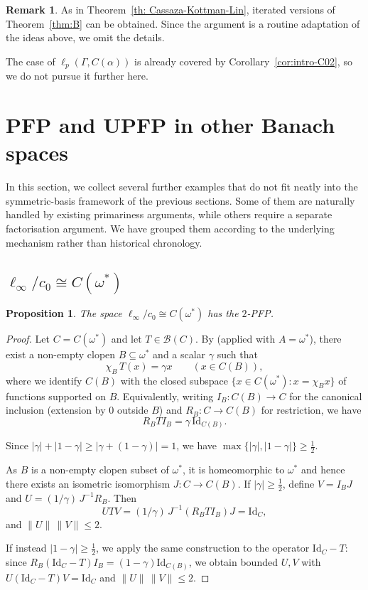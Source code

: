\documentclass[11pt]{amsart}
\theoremstyle{plain}
\newtheorem{proposition}[theorem]{Proposition}
\theoremstyle{definition}
\newtheorem{remark}[theorem]{Remark}
\numberwithin{equation}{section}
\newcommand{\Id}{\mathrm{Id}}
\renewcommand{\le}{\leqslant}
\renewcommand{\ge}{\geqslant}
\begin{document}
\begin{remark}
As in Theorem~\ref{th: Cassaza-Kottman-Lin}, iterated versions of Theorem~\ref{thm:B} can be obtained.  Since the argument is a routine adaptation of the ideas above, we omit the details.
\end{remark}

The case of $\ell_p(\Gamma,C(\alpha))$ is already covered by Corollary~\ref{cor:intro-C02}, so we do not pursue it further here.

\section{PFP and UPFP in other Banach spaces}

In this section, we collect several further examples that do not fit neatly into the symmetric-basis framework of the previous sections. Some of them are naturally handled by existing primariness arguments, while others require a separate factorisation argument. We have grouped them according to the underlying mechanism rather than historical chronology.

\subsection{\texorpdfstring{$\ell_\infty/c_0 \cong C(\omega^*)$}{l_infty/c_0 ≅ C(ω*)}}

\begin{proposition}\label{prop: l_infty-quot-c0}
The space $\ell_\infty/c_0 \cong C(\omega^*)$ has the $2$-PFP.
\end{proposition}

\begin{proof}
Let $C=C(\omega^*)$ and let $T\in\mathscr B(C)$.
By \cite[Theorem~2.1]{DrewnowskiRoberts1991} (applied with $A=\omega^*$), there exist a non-empty clopen $B\subseteq \omega^*$ and a scalar $\gamma$ such that
\[
\chi_B\,T(x)=\gamma x\qquad(x\in C(B)),
\]
where we identify $C(B)$ with the closed subspace
$\{x\in C(\omega^*): x=\chi_B x\}$ of functions supported on $B$.
Equivalently, writing $I_B\colon C(B)\to C$ for the canonical inclusion
(extension by $0$ outside $B$) and $R_B\colon C\to C(B)$ for restriction, we have
\[
R_BT I_B=\gamma\,\Id_{C(B)}.
\]

Since $|\gamma|+|1-\gamma|\ge |\gamma+(1-\gamma)|=1$, we have
$\max\{|\gamma|,|1-\gamma|\}\ge \tfrac12$.

As $B$ is a non-empty clopen subset of $\omega^*$, it is homeomorphic to $\omega^*$
and hence there exists an isometric isomorphism $J\colon C\to C(B)$.
If $|\gamma|\ge \tfrac12$, define $V=I_BJ$ and $U=(1/\gamma)\,J^{-1}R_B$. Then
\[
UTV=(1/\gamma)\,J^{-1}(R_BT I_B)J=\Id_C,
\]
and $\|U\|\,\|V\|\le 2$.

If instead $|1-\gamma|\ge \tfrac12$, we apply the same construction to the operator $\Id_C-T$:
since $R_B(\Id_C-T)I_B=(1-\gamma)\Id_{C(B)}$, we obtain bounded $U,V$ with
$U(\Id_C-T)V=\Id_C$ and $\|U\|\,\|V\|\le 2$.
\end{proof}
\end{document}
